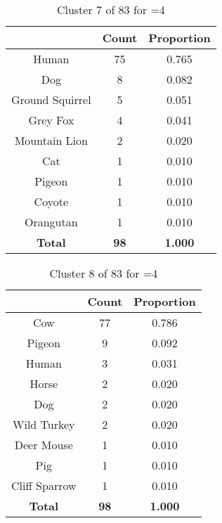 \begin{table}[ht!]
\centering
\begin{tabular}{|c|c|c|}
\hline
\bf \Spec{} &\bf Count &\bf Proportion\\ \hline \hline
Human & 75 & 0.765\\ \hline
Dog & 8 & 0.082\\ \hline
Ground Squirrel & 5 & 0.051\\ \hline
Grey Fox & 4 & 0.041\\ \hline
Mountain Lion & 2 & 0.020\\ \hline
Cat & 1 & 0.010\\ \hline
Pigeon & 1 & 0.010\\ \hline
Coyote & 1 & 0.010\\ \hline
Orangutan & 1 & 0.010\\ \hline
\hline
\bf Total & \bf 98 & \bf 1.000\\ \hline
\end{tabular}
\label{tab:cluster:7:4}
\caption{Cluster 7 of 83 for \minneigh{}=4}
\end{table}

\begin{table}[ht!]
\centering
\begin{tabular}{|c|c|c|}
\hline
\bf \Spec{} &\bf Count &\bf Proportion\\ \hline \hline
Cow & 77 & 0.786\\ \hline
Pigeon & 9 & 0.092\\ \hline
Human & 3 & 0.031\\ \hline
Horse & 2 & 0.020\\ \hline
Dog & 2 & 0.020\\ \hline
Wild Turkey & 2 & 0.020\\ \hline
Deer Mouse & 1 & 0.010\\ \hline
Pig & 1 & 0.010\\ \hline
Cliff Sparrow & 1 & 0.010\\ \hline
\hline
\bf Total & \bf 98 & \bf 1.000\\ \hline
\end{tabular}
\label{tab:cluster:8:4}
\caption{Cluster 8 of 83 for \minneigh{}=4}
\end{table}


